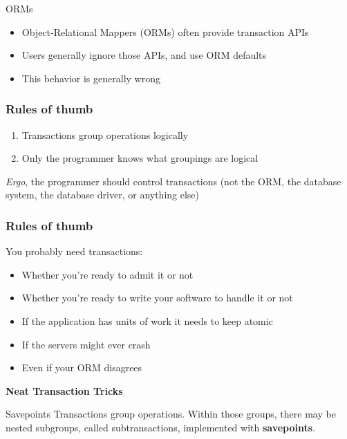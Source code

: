 \documentclass[svgnames]{beamer}
\begin{document}
\begin{frame}{ORMs}
    \begin{itemize}
        \item Object-Relational Mappers (ORMs) often provide transaction APIs
        \item Users generally ignore those APIs, and use ORM defaults
        \item This behavior is generally wrong
    \end{itemize}
\end{frame}

\begin{frame}
    \frametitle{Rules of thumb}
    \begin{enumerate}
        \item Transactions group operations logically
        \item Only the programmer knows what groupings are logical
    \end{enumerate}
\textit{Ergo}, the programmer should control transactions (not the ORM, the database system, the database driver, or anything else)
\end{frame}

\begin{frame}
    \frametitle{Rules of thumb}
    You probably need transactions:
    \begin{itemize}
        \item Whether you're ready to admit it or not
        \item Whether you're ready to write your software to handle it or not
        \item If the application has units of work it needs to keep atomic
        \item If the servers might ever crash
        \item Even if your ORM disagrees
    \end{itemize}
\end{frame}

\begin{frame}
    \begin{centering}
        \textbf{Neat Transaction Tricks}
        \par
    \end{centering}
\end{frame}

\begin{frame}{Savepoints}
    Transactions group operations. Within those groups, there may be nested
    subgroups, called subtransactions, implemented with \textbf{savepoints}.
\end{frame}
\end{document}
